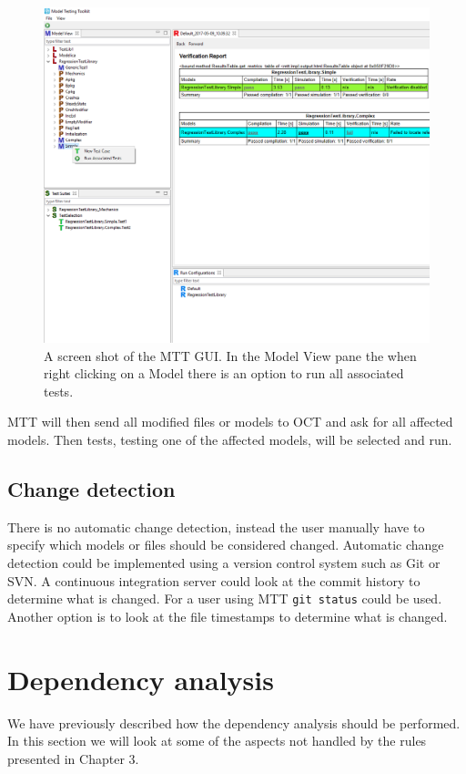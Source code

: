\documentclass{cslthse-msc}
\begin{document}
\begin{figure}[!hbtp]
    \includegraphics[width=1.0\textwidth]{Pictures/MTT_Capture.png}
    \caption{A screen shot of the MTT GUI. In the Model View pane the when right clicking on a Model there is an option to run all associated tests.}
    \label{fig:MTTrun}
\end{figure}

MTT will then send all modified files or models to OCT and ask for all affected models. Then tests, testing one of the affected models, will be selected and run.

\subsection{Change detection}
There is no automatic change detection, instead the user manually have to specify which models or files should be considered changed. Automatic change detection could be implemented using a version control system such as Git or SVN. A continuous integration server could look at the commit history to determine what is changed. For a user using MTT \texttt{git status} could be used. Another option is to look at the file timestamps to determine what is changed.

\section{Dependency analysis}
We have previously described how the dependency analysis should be performed. In this section we will look at some of the aspects not handled by the rules presented in Chapter 3.
\end{document}
